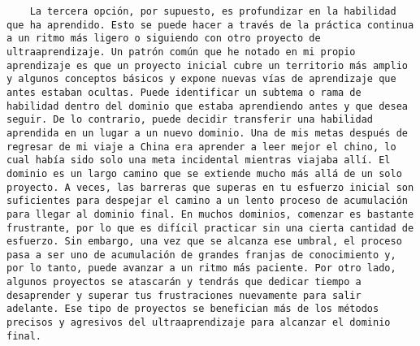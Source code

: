\begin{verbatim}
	La tercera opción, por supuesto, es profundizar en la habilidad que ha aprendido. Esto se puede hacer a través de la práctica continua a un ritmo más ligero o siguiendo con otro proyecto de ultraaprendizaje. Un patrón común que he notado en mi propio aprendizaje es que un proyecto inicial cubre un territorio más amplio y algunos conceptos básicos y expone nuevas vías de aprendizaje que antes estaban ocultas. Puede identificar un subtema o rama de habilidad dentro del dominio que estaba aprendiendo antes y que desea seguir. De lo contrario, puede decidir transferir una habilidad aprendida en un lugar a un nuevo dominio. Una de mis metas después de regresar de mi viaje a China era aprender a leer mejor el chino, lo cual había sido solo una meta incidental mientras viajaba allí. El dominio es un largo camino que se extiende mucho más allá de un solo proyecto. A veces, las barreras que superas en tu esfuerzo inicial son suficientes para despejar el camino a un lento proceso de acumulación para llegar al dominio final. En muchos dominios, comenzar es bastante frustrante, por lo que es difícil practicar sin una cierta cantidad de esfuerzo. Sin embargo, una vez que se alcanza ese umbral, el proceso pasa a ser uno de acumulación de grandes franjas de conocimiento y, por lo tanto, puede avanzar a un ritmo más paciente. Por otro lado, algunos proyectos se atascarán y tendrás que dedicar tiempo a desaprender y superar tus frustraciones nuevamente para salir adelante. Ese tipo de proyectos se benefician más de los métodos precisos y agresivos del ultraaprendizaje para alcanzar el dominio final.
\end{verbatim}

